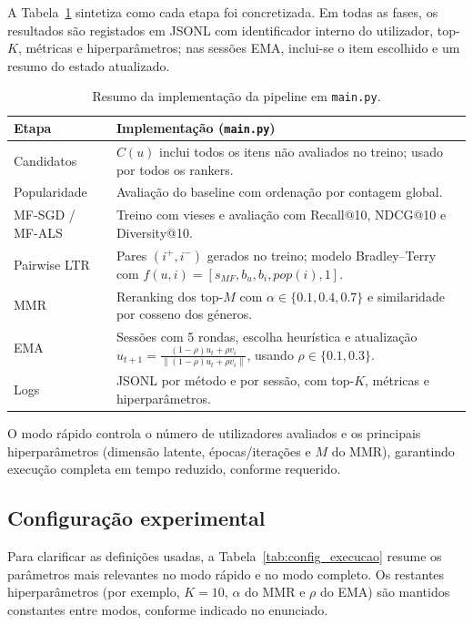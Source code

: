 \documentclass[10pt]{article}
\begin{document}
A Tabela~\ref{tab:pipeline_impl} sintetiza como cada etapa foi concretizada. Em todas as fases, os resultados são registados em JSONL com identificador interno do utilizador, top-\(K\), métricas e hiperparâmetros; nas sessões EMA, inclui-se o item escolhido e um resumo do estado atualizado.

\begin{table}[H]
\centering
\small
\renewcommand{\arraystretch}{1.2}
\begin{tabular}{p{} p{}}
\toprule
\textbf{Etapa} & \textbf{Implementação (\texttt{main.py})} \\
\midrule
Candidatos & \(C(u)\) inclui todos os itens não avaliados no treino; usado por todos os rankers. \\
Popularidade & Avaliação do baseline com ordenação por contagem global. \\
MF-SGD / MF-ALS & Treino com vieses e avaliação com Recall@10, NDCG@10 e Diversity@10. \\
Pairwise LTR & Pares \((i^+, i^-)\) gerados no treino; modelo Bradley--Terry com \(f(u,i)=[s_{MF}, b_u, b_i, pop(i), 1]\). \\
MMR & Reranking dos top-\(M\) com \(\alpha \in \{0.1,0.4,0.7\}\) e similaridade por cosseno dos géneros. \\
EMA & Sessões com 5 rondas, escolha heurística e atualização \(u_{t+1} = \frac{(1-\rho)u_t + \rho v_i}{\|(1-\rho)u_t + \rho v_i\|}\), usando \(\rho\in\{0.1,0.3\}\). \\
Logs & JSONL por método e por sessão, com top-\(K\), métricas e hiperparâmetros. \\
\bottomrule
\end{tabular}
\caption{Resumo da implementação da pipeline em \texttt{main.py}.}
\label{tab:pipeline_impl}
\end{table}

O modo rápido controla o número de utilizadores avaliados e os principais hiperparâmetros (dimensão latente, épocas/iterações e \(M\) do MMR), garantindo execução completa em tempo reduzido, conforme requerido.


\subsection{Configuração experimental}
Para clarificar as definições usadas, a Tabela~\ref{tab:config_execucao} resume os parâmetros mais relevantes no modo rápido e no modo completo. Os restantes hiperparâmetros (por exemplo, \(K=10\), \(\alpha\) do MMR e \(\rho\) do EMA) são mantidos constantes entre modos, conforme indicado no enunciado.
\end{document}
